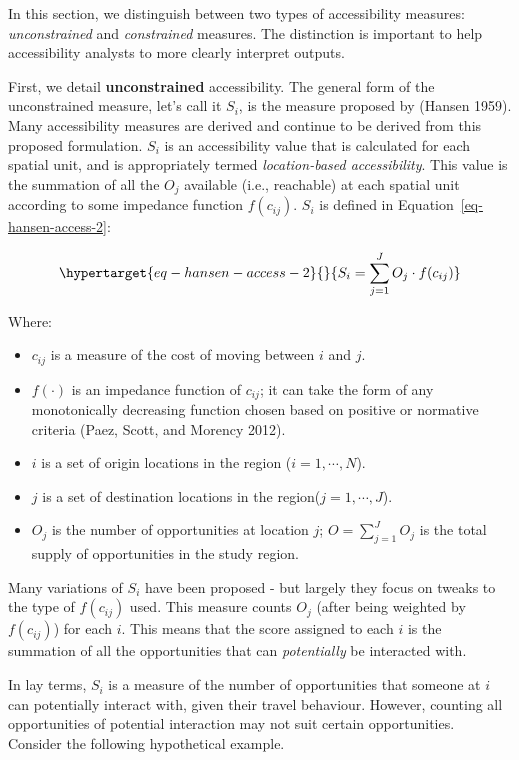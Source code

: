 \documentclass[12pt, oneside]{report}
\providecommand{\tightlist}{%
  \setlength{\itemsep}{0pt}\setlength{\parskip}{0pt}}\usepackage{longtable,booktabs,array}
\begin{document}
In this section, we distinguish between two types of accessibility
measures: \emph{unconstrained} and \emph{constrained} measures. The
distinction is important to help accessibility analysts to more clearly
interpret outputs.

First, we detail \textbf{unconstrained} accessibility. The general form
of the unconstrained measure, let's call it \(S_i\), is the measure
proposed by (Hansen 1959). Many accessibility measures are derived and
continue to be derived from this proposed formulation. \(S_i\) is an
accessibility value that is calculated for each spatial unit, and is
appropriately termed \emph{location-based accessibility}. This value is
the summation of all the \(O_j\) available (i.e., reachable) at each
spatial unit according to some impedance function \(f(c_{ij})\). \(S_i\)
is defined in Equation~\ref{eq-hansen-access-2}:

\begin{equation}\protect\hypertarget{eq-hansen-access-2}{}{
S_i = \sum_{j=1}^JO_j \cdot f(c_{ij})
}\label{eq-hansen-access-2}\end{equation}

\noindent Where:

\begin{itemize}
\tightlist
\item
  \(c_{ij}\) is a measure of the cost of moving between \(i\) and \(j\).
\item
  \(f(\cdot)\) is an impedance function of \(c_{ij}\); it can take the
  form of any monotonically decreasing function chosen based on positive
  or normative criteria (Paez, Scott, and Morency 2012).
\item
  \(i\) is a set of origin locations in the region (\(i = 1,\cdots,N\)).
\item
  \(j\) is a set of destination locations in the
  region(\(j = 1,\cdots,J\)).
\item
  \(O_j\) is the number of opportunities at location \(j\);
  \(O = \sum_{j=1}^J O_j\) is the total supply of opportunities in the
  study region.
\end{itemize}

Many variations of \(S_i\) have been proposed - but largely they focus
on tweaks to the type of \(f(c_{ij})\) used. This measure counts \(O_j\)
(after being weighted by \(f(c_{ij})\)) for each \(i\). This means that
the score assigned to each \(i\) is the summation of all the
opportunities that can \emph{potentially} be interacted with.

In lay terms, \(S_i\) is a measure of the number of opportunities that
someone at \(i\) can potentially interact with, given their travel
behaviour. However, counting all opportunities of potential interaction
may not suit certain opportunities. Consider the following hypothetical
example.
\end{document}
